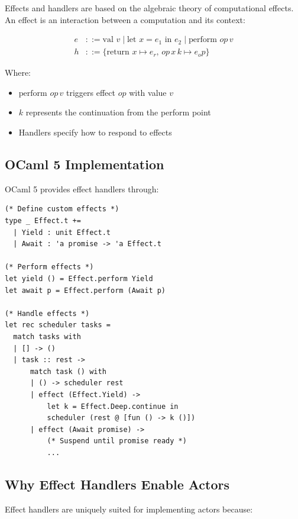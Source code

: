\documentclass[12pt,a4paper]{report}
\begin{document}
Effects and handlers are based on the algebraic theory of computational effects. An effect is an interaction between a computation and its context:

\begin{align}
e &::= \text{val } v \mid \text{let } x = e_1 \text{ in } e_2 \mid \text{perform } op \, v \\
h &::= \{ \text{return } x \mapsto e_r, \, op \, x \, k \mapsto e_op \}
\end{align}

Where:
\begin{itemize}
\item $\text{perform } op \, v$ triggers effect $op$ with value $v$
\item $k$ represents the continuation from the perform point
\item Handlers specify how to respond to effects
\end{itemize}

\subsection{OCaml 5 Implementation}

OCaml 5 provides effect handlers through:

\begin{lstlisting}
(* Define custom effects *)
type _ Effect.t += 
  | Yield : unit Effect.t
  | Await : 'a promise -> 'a Effect.t

(* Perform effects *)
let yield () = Effect.perform Yield
let await p = Effect.perform (Await p)

(* Handle effects *)
let rec scheduler tasks =
  match tasks with
  | [] -> ()
  | task :: rest ->
      match task () with
      | () -> scheduler rest
      | effect (Effect.Yield) ->
          let k = Effect.Deep.continue in
          scheduler (rest @ [fun () -> k ()])
      | effect (Await promise) ->
          (* Suspend until promise ready *)
          ...
\end{lstlisting}

\subsection{Why Effect Handlers Enable Actors}

Effect handlers are uniquely suited for implementing actors because:
\end{document}
